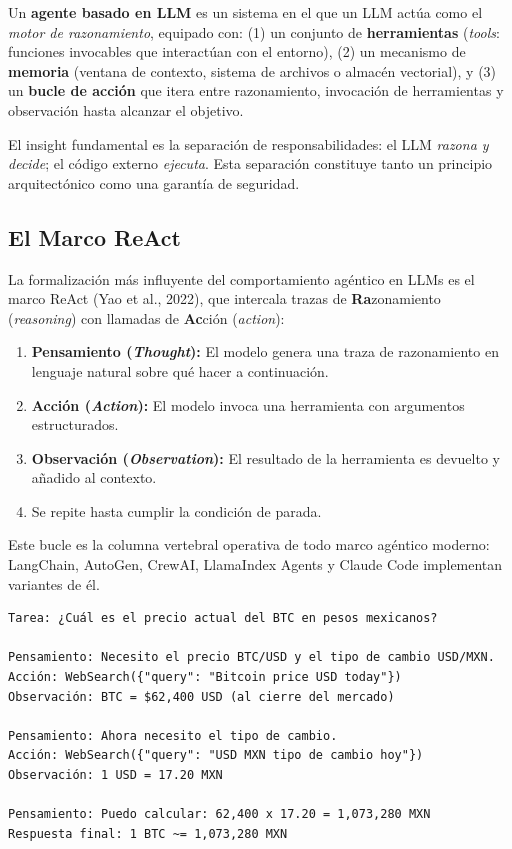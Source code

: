 \documentclass[11pt,letterpaper]{article}
\begin{document}
\begin{definitionbox}[title=Agente Basado en LLM]
Un \textbf{agente basado en LLM} es un sistema en el que un LLM actúa como el \emph{motor de razonamiento}, equipado con: (1) un conjunto de \textbf{herramientas} (\textit{tools}: funciones invocables que interactúan con el entorno), (2) un mecanismo de \textbf{memoria} (ventana de contexto, sistema de archivos o almacén vectorial), y (3) un \textbf{bucle de acción} que itera entre razonamiento, invocación de herramientas y observación hasta alcanzar el objetivo.
\end{definitionbox}

El insight fundamental es la separación de responsabilidades: el LLM \emph{razona y decide}; el código externo \emph{ejecuta}. Esta separación constituye tanto un principio arquitectónico como una garantía de seguridad.

\subsection{El Marco ReAct}

La formalización más influyente del comportamiento agéntico en LLMs es el marco ReAct (Yao et al., 2022), que intercala trazas de \textbf{Ra}zonamiento (\textit{reasoning}) con llamadas de \textbf{Ac}ción (\textit{action}):

\begin{enumerate}[leftmargin=*]
    \item \textbf{Pensamiento (\textit{Thought}):} El modelo genera una traza de razonamiento en lenguaje natural sobre qué hacer a continuación.
    \item \textbf{Acción (\textit{Action}):} El modelo invoca una herramienta con argumentos estructurados.
    \item \textbf{Observación (\textit{Observation}):} El resultado de la herramienta es devuelto y añadido al contexto.
    \item Se repite hasta cumplir la condición de parada.
\end{enumerate}

Este bucle es la columna vertebral operativa de todo marco agéntico moderno: LangChain, AutoGen, CrewAI, LlamaIndex Agents y Claude Code implementan variantes de él.

\begin{examplebox}[title=Ejemplo de Traza ReAct]
\begin{verbatim}
Tarea: ¿Cuál es el precio actual del BTC en pesos mexicanos?

Pensamiento: Necesito el precio BTC/USD y el tipo de cambio USD/MXN.
Acción: WebSearch({"query": "Bitcoin price USD today"})
Observación: BTC = $62,400 USD (al cierre del mercado)

Pensamiento: Ahora necesito el tipo de cambio.
Acción: WebSearch({"query": "USD MXN tipo de cambio hoy"})
Observación: 1 USD = 17.20 MXN

Pensamiento: Puedo calcular: 62,400 x 17.20 = 1,073,280 MXN
Respuesta final: 1 BTC ~= 1,073,280 MXN
\end{verbatim}
\end{examplebox}
\end{document}
